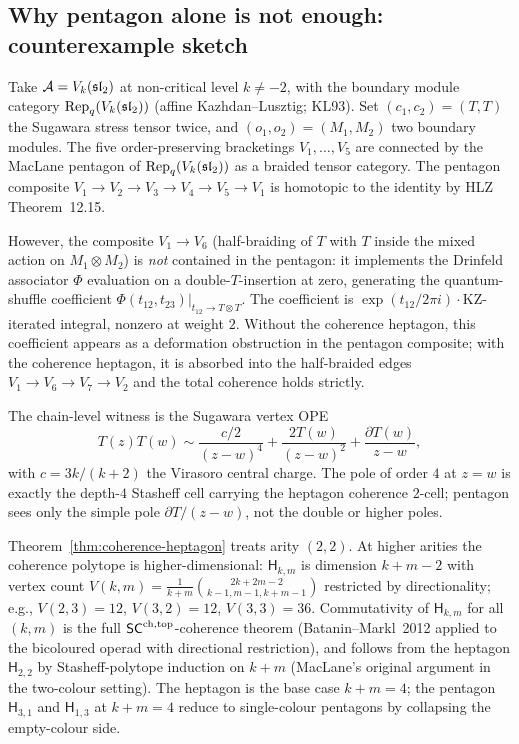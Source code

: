 \subsection{Why pentagon alone is not enough: counterexample sketch}

\begin{example}\label{ex:pentagon-fails-vk}%
%
Take $\mathcal{A} = V_k(\mathfrak{sl}_2)$ at non-critical level $k\neq -2$, with the
boundary module category $\mathrm{Rep}_q(V_k(\mathfrak{sl}_2))$ (affine
Kazhdan--Lusztig; KL93). Set
$(c_1, c_2) = (T, T)$ the Sugawara stress tensor twice, and
$(o_1, o_2) = (M_1, M_2)$ two boundary modules. The five
order-preserving bracketings $V_1,\ldots,V_5$ are connected by the
MacLane pentagon of $\mathrm{Rep}_q(V_k(\mathfrak{sl}_2))$ as a braided tensor
category. The pentagon composite $V_1 \to V_2\to V_3\to V_4\to V_5\to V_1$
is homotopic to the identity by HLZ~\cite{HLZ}\,Theorem~12.15.

However, the composite $V_1 \to V_6$
(half-braiding of $T$ with $T$ inside the mixed action on
$M_1 \otimes M_2$) is \emph{not} contained in the pentagon: it
implements the Drinfeld associator $\Phi$ evaluation on a
double-$T$-insertion at zero, generating the quantum-shuffle
coefficient
$\Phi(t_{12}, t_{23})\bigl|_{t_{12}\to T\otimes T}$. The coefficient
is $\exp(t_{12}/2\pi i)\cdot \mathrm{KZ}$-iterated integral, nonzero
at weight $2$. Without the coherence heptagon, this coefficient
appears as a deformation obstruction in the pentagon composite;
with the coherence heptagon, it is absorbed into the half-braided
edges $V_1\to V_6\to V_7\to V_2$ and the total coherence holds
strictly.

The chain-level witness is the Sugawara vertex OPE
\[
T(z)T(w) \sim \frac{c/2}{(z-w)^4} + \frac{2T(w)}{(z-w)^2}
 + \frac{\partial T(w)}{z-w},
\]
with $c = 3k/(k+2)$ the Virasoro central charge. The pole of order
$4$ at $z = w$ is exactly the depth-$4$ Stasheff cell carrying the
heptagon coherence $2$-cell; pentagon sees only the simple pole
$\partial T/(z-w)$, not the double or higher poles.
\end{example}

\begin{remark}
\label{rem:heptagon-scope}%
Theorem~\ref{thm:coherence-heptagon} treats arity $(2, 2)$. At
higher arities the coherence polytope is higher-dimensional:
$\mathsf{H}_{k,m}$ is dimension $k + m - 2$ with vertex count
$V(k, m) = \tfrac{1}{k+m}\binom{2k+2m-2}{k-1,m-1,k+m-1}$
restricted by directionality; e.g.,
$V(2, 3) = 12$, $V(3, 2) = 12$, $V(3, 3) = 36$. Commutativity of
$\mathsf{H}_{k,m}$ for all $(k, m)$ is the full $\mathsf{SC}^{\mathrm{ch},\mathrm{top}}$-coherence
theorem (Batanin--Markl~2012 applied to the bicoloured operad
with directional restriction), and follows from the heptagon
$\mathsf{H}_{2,2}$ by Stasheff-polytope induction on
$k + m$ (MacLane's original argument in the two-colour setting).
The heptagon is the base case $k + m = 4$; the pentagon
$\mathsf{H}_{3,1}$ and $\mathsf{H}_{1,3}$ at $k + m = 4$ reduce
to single-colour pentagons by collapsing the empty-colour side.
\end{remark}

